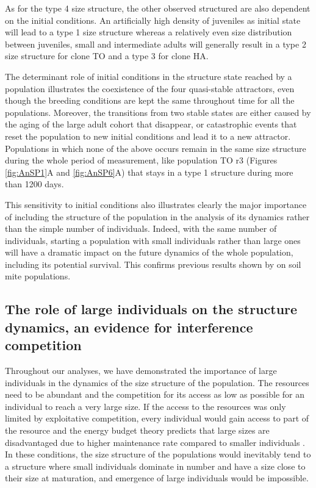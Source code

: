 As for the type 4 size structure, the other observed structured are also
dependent on the initial conditions. An artificially high density of juveniles
as initial state will lead to a type 1 size structure whereas a relatively even
size distribution between juveniles, small and intermediate adults will
generally result in a type 2 size structure for clone TO and a type 3 for clone
HA.

The determinant role of initial conditions in the structure state reached by a
population illustrates the coexistence of the four quasi-stable attractors, even
though the breeding conditions are kept the same throughout time for all the
populations. Moreover, the transitions from two stable states are either caused
by the aging of the large adult cohort that disappear, or catastrophic events
that reset the population to new initial conditions and lead it to a new
attractor. Populations in which none of the above occurs remain in the same size
structure during the whole period of measurement, like population TO r3 (Figures
\ref{fig:AnSP1}A and \ref{fig:AnSP6}A) that stays in a type 1 structure during more than 1200
days.

This sensitivity to initial conditions also illustrates clearly the major
importance of including the structure of the population in the analysis of its
dynamics rather than the simple number of individuals. Indeed, with the same
number of individuals, starting a population with small individuals rather than
large ones will have a dramatic impact on the future dynamics of the whole
population, including its potential survival. This confirms previous results
shown by \textcites{benton2005a} on soil mite populations.

\subsection{The role of large individuals on the structure dynamics, an evidence
for interference competition}

Throughout our analyses, we have demonstrated the importance of large
individuals in the dynamics of the size structure of the population. The
resources need to be abundant and the competition for its access as low as
possible for an individual to reach a very large size. If the access to the
resources was only limited by exploitative competition, every individual would
gain access to part of the resource and the energy budget theory predicts that
large sizes are disadvantaged due to higher maintenance rate compared
to smaller individuals \autocites{de-roos2003b}. In these conditions, the
size structure of the populations would inevitably tend to a structure where small individuals
dominate in number and have a size close to their size at maturation, and
emergence of large individuals would be impossible.

